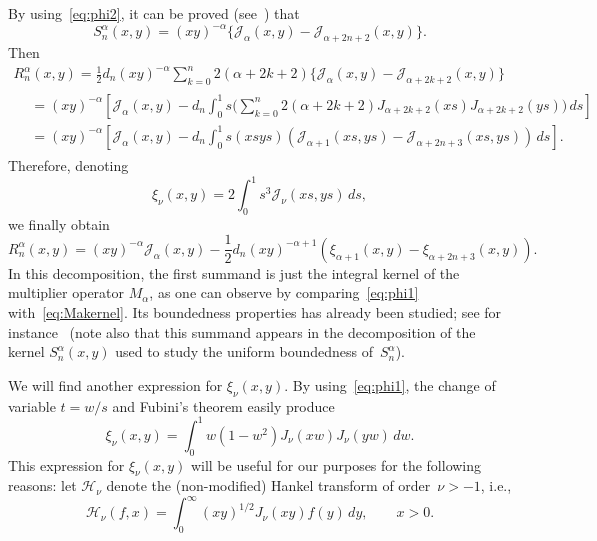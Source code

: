 \documentclass[a4paper]{amsart}
\newcommand{\calH}{\mathcal{H}}
\newcommand{\calJ}{\mathcal{J}}
\begin{document}
By using~\eqref{eq:phi2}, it can be proved (see~\cite{CiGPV}) that
\begin{equation}
\label{eq:kernelKn}
  S_n^\alpha(x,y) = (xy)^{-\alpha} \{\calJ_\alpha(x,y)
  - \calJ_{\alpha+2n+2}(x,y)\}.
\end{equation}
Then
\begin{multline*}
  R_n^\alpha(x,y) = \frac{1}{2}d_n (xy)^{-\alpha}
    \sum_{k=0}^n 2(\alpha+2k+2) \{\calJ_\alpha(x,y)
      - \calJ_{\alpha+2k+2}(x,y)\} \\
  \begin{aligned}
  &= (xy)^{-\alpha} \left[\calJ_\alpha(x,y)
    - d_n \int_0^1 s\bigg( \sum_{k=0}^n 2(\alpha+2k+2)
    J_{\alpha+2k+2}(xs) J_{\alpha+2k+2}(ys)\bigg) \,ds\right] \\
  &= (xy)^{-\alpha}\left[\calJ_\alpha(x,y)
    - d_n \int_0^1 s (xsys) (\calJ_{\alpha+1}(xs,ys)
    - \calJ_{\alpha+2n+3}(xs,ys)) \,ds\right].
  \end{aligned}
\end{multline*}
Therefore, denoting
\begin{equation*}
  \xi_\nu(x,y) = 2 \int_0^1 s^3 \calJ_\nu(xs,ys) \,ds,
\end{equation*}
we finally obtain
\begin{equation}
\label{eq:Jn3sum}
  R_n^\alpha(x,y) = (xy)^{-\alpha} \calJ_\alpha(x,y)
  - \frac{1}{2}d_n(xy)^{-\alpha+1}( \xi_{\alpha+1}(x,y)
  - \xi_{\alpha+2n+3}(x,y)).
\end{equation}
In this decomposition, the first summand is just the integral kernel of the
multiplier operator $M_\alpha$, as one can observe by comparing~\eqref{eq:phi1}
with~\eqref{eq:Makernel}.
Its boundedness properties has already been studied;
see for instance~\cite{CiGPV}
(note also that this summand appears in the decomposition
of the kernel $S_n^\alpha(x,y)$ used to study the uniform
boundedness of~$S_n^\alpha$).

We will find another expression for $\xi_\nu(x,y)$. By using~\eqref{eq:phi1},
the change of variable $t=w/s$ and Fubini's theorem easily produce
\begin{equation*}
  \xi_\nu(x,y)=\int_0^1 w(1-w^2) J_\nu(xw) J_\nu(yw) \,dw.
\end{equation*}
This expression for $\xi_\nu(x,y)$ will be useful for our purposes for the
following reasons: let $\calH_\nu$ denote the (non-modified) Hankel
transform of order~$\nu > -1$, i.e.,
\begin{equation*}
  \calH_\nu(f,x)
  = \int_0^\infty (xy)^{1/2}J_\nu(xy)f(y)\,dy, \qquad x>0.
\end{equation*}
\end{document}
